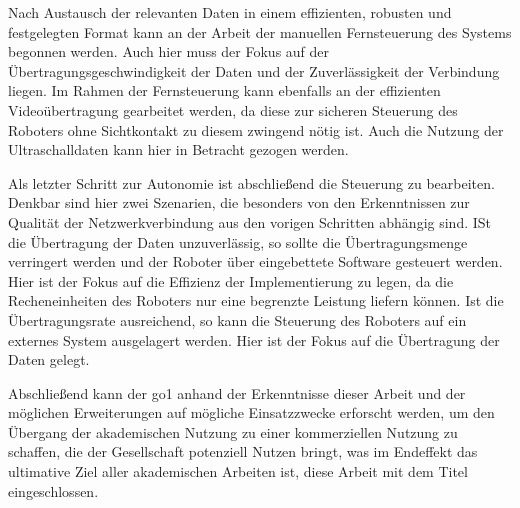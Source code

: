 Nach Austausch der relevanten Daten in einem effizienten, robusten und festgelegten Format kann an der Arbeit der manuellen
Fernsteuerung des Systems begonnen werden.
Auch hier muss der Fokus auf der Übertragungsgeschwindigkeit der Daten und der Zuverlässigkeit der Verbindung liegen.
Im Rahmen der Fernsteuerung kann ebenfalls an der effizienten Videoübertragung gearbeitet werden, da diese zur sicheren Steuerung
des Roboters ohne Sichtkontakt zu diesem zwingend nötig ist.
Auch die Nutzung der Ultraschalldaten kann hier in Betracht gezogen werden.

Als letzter Schritt zur Autonomie ist abschließend die Steuerung zu bearbeiten.
Denkbar sind hier zwei Szenarien, die besonders von den Erkenntnissen zur Qualität der Netzwerkverbindung aus den
vorigen Schritten abhängig sind.
ISt die Übertragung der Daten unzuverlässig, so sollte die Übertragungsmenge verringert werden und der Roboter
über eingebettete Software gesteuert werden.
Hier ist der Fokus auf die Effizienz der Implementierung zu legen, da die Recheneinheiten des Roboters nur
eine begrenzte Leistung liefern können.
Ist die Übertragungsrate ausreichend, so kann die Steuerung des Roboters auf ein externes System ausgelagert
werden.
Hier ist der Fokus auf die Übertragung der Daten gelegt.

Abschließend kann der \gls{go1} anhand der Erkenntnisse dieser Arbeit und der möglichen Erweiterungen auf
mögliche Einsatzzwecke erforscht werden, um den Übergang der akademischen Nutzung zu einer kommerziellen Nutzung
zu schaffen, die der Gesellschaft potenziell Nutzen bringt, was im Endeffekt das ultimative Ziel aller akademischen Arbeiten
ist, diese Arbeit mit dem Titel \emph{\mytitle} eingeschlossen.


